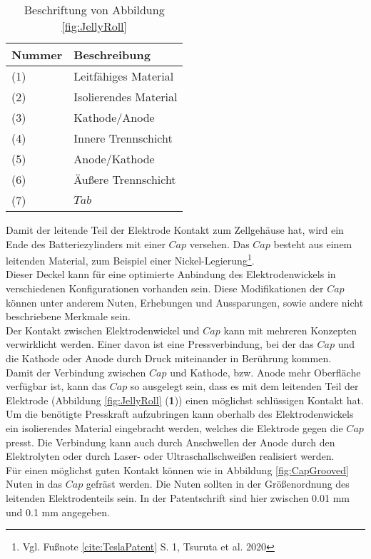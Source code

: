 \begin{table}[h!]
	\caption{Beschriftung von Abbildung \ref{fig:JellyRoll}}
	\label{tab:BeschriftungJellyRoll}
	\vspace{0.2cm}	
	\begin{tabularx}{\textwidth}{ |X|X|  }
		\toprule[1.5pt]
		\textbf{Nummer} & \textbf{Beschreibung} \\
		\hline\hline
		(1) & Leitfähiges Material \\
		\hline
		(2) & Isolierendes Material\\
		\hline
		(3) & Kathode/Anode\\
		\hline
		(4) & Innere Trennschicht\\
		\hline
		(5) & Anode/Kathode\\
		\hline
		(6) & Äußere Trennschicht\\
		\hline
		(7) & $Tab$\\
		\bottomrule[1.5pt]
	\end{tabularx}		
\end{table}

Damit der leitende Teil der Elektrode Kontakt zum Zellgehäuse hat, wird ein Ende des Batteriezylinders mit einer $Cap$ versehen. Das $Cap$ besteht aus einem leitenden Material, zum Beispiel einer Nickel-Legierung\footnote{Vgl. Fußnote \ref{cite:TeslaPatent} S. 1, Tsuruta et al. 2020}.\\
Dieser Deckel kann für eine optimierte Anbindung des Elektrodenwickels in verschiedenen Konfigurationen vorhanden sein. Diese Modifikationen der $Cap$ können unter anderem Nuten, Erhebungen und Aussparungen, sowie andere nicht beschriebene Merkmale sein.\\
Der Kontakt zwischen Elektrodenwickel und $Cap$ kann mit mehreren Konzepten verwirklicht werden. Einer davon ist eine Pressverbindung, bei der das $Cap$ und die Kathode oder Anode durch Druck miteinander in Berührung kommen.\\
Damit der Verbindung zwischen $Cap$ und Kathode, bzw. Anode mehr Oberfläche verfügbar ist, kann das $Cap$ so ausgelegt sein, dass es mit dem leitenden Teil der Elektrode (Abbildung \ref{fig:JellyRoll} (\textbf{1})) einen möglichst schlüssigen Kontakt hat. Um die benötigte Presskraft aufzubringen kann oberhalb des Elektrodenwickels ein isolierendes Material eingebracht werden, welches die Elektrode gegen die $Cap$ presst. Die Verbindung kann auch durch Anschwellen der Anode durch den Elektrolyten oder durch Laser- oder Ultraschallschweißen realisiert werden.\\
Für einen möglichst guten Kontakt können wie in Abbildung \ref{fig:CapGrooved} Nuten in das $Cap$ gefräst werden. Die Nuten sollten in der Größenordnung des leitenden Elektrodenteils sein. In der Patentschrift sind hier zwischen 0.01 mm und 0.1 mm angegeben.\\

